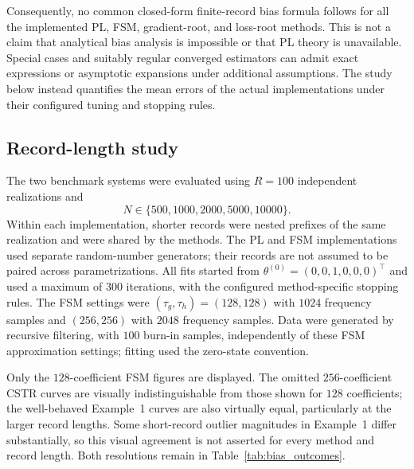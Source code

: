 Consequently, no common closed-form finite-record bias formula follows
for all the implemented PL, FSM, gradient-root, and loss-root methods.
This is not a claim that analytical bias analysis is impossible or
that PL theory is unavailable. Special cases and suitably regular
converged estimators can admit exact expressions or asymptotic
expansions under additional assumptions. The study below instead
quantifies the mean errors of the actual implementations under their
configured tuning and stopping rules.

\subsection{Record-length study}
\label{app:ws_bias_record_length}

The two benchmark systems were evaluated using $R=100$ independent
realizations and
\[
 N\in\{500,1000,2000,5000,10000\}.
\]
Within each implementation, shorter records were nested prefixes of the
same realization and were shared by the methods. The PL and FSM
implementations used separate random-number generators; their records
are not assumed to be paired across parametrizations. All fits started
from
$\theta^{(0)}=(0,0,1,0,0,0)^\top$ and used a maximum of $300$ iterations,
with the configured method-specific stopping rules. The FSM settings
were $(\tau_g,\tau_h)=(128,128)$ with $1024$ frequency samples and
$(256,256)$ with $2048$ frequency samples. Data were generated by
recursive filtering, with $100$ burn-in samples, independently of these
FSM approximation settings; fitting used the zero-state convention.

Only the $128$-coefficient FSM figures are displayed. The omitted
$256$-coefficient CSTR curves are visually indistinguishable from those
shown for $128$ coefficients; the well-behaved Example~1 curves are
also virtually equal, particularly at the larger record lengths.
Some short-record outlier magnitudes in Example~1 differ substantially,
so this visual agreement is not asserted for every method and record
length. Both resolutions remain in Table~\ref{tab:bias_outcomes}.

